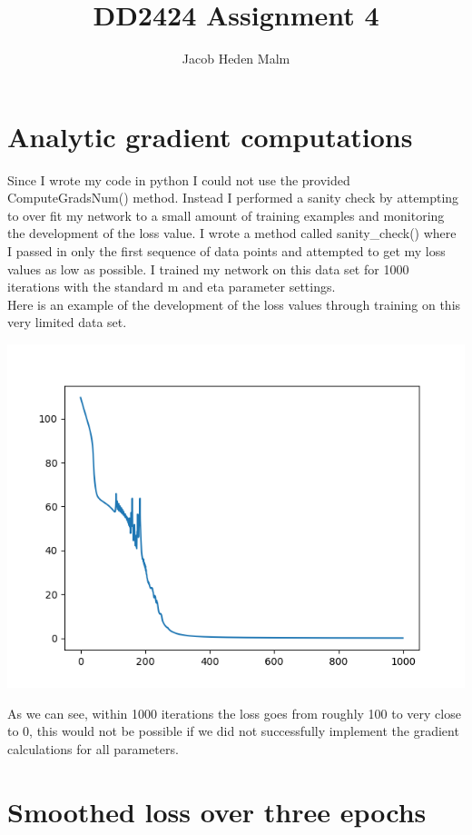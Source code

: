 \documentclass[11pt,a4paper]{article}
\author{Jacob Heden Malm}
\title{DD2424 Assignment 4}
\begin{document}
\maketitle

\section{Analytic gradient computations}

Since I wrote my code in python I could not use the provided ComputeGradsNum() method. Instead I performed a sanity check by attempting to over fit my network to a small amount of training examples and monitoring the development of the loss value. I wrote a method called sanity\_check() where I passed in only the first sequence of data points and attempted to get my loss values as low as possible. I trained my network on this data set for 1000 iterations with the standard m and eta parameter settings.\\

Here is an example of the development of the loss values through training on this very limited data set.

\includegraphics[width=\textwidth]{sanity_check.png}

As we can see, within 1000 iterations the loss goes from roughly 100 to very close to 0, this would not be possible if we did not successfully implement the gradient calculations for all parameters.


\section{Smoothed loss over three epochs}
\end{document}
